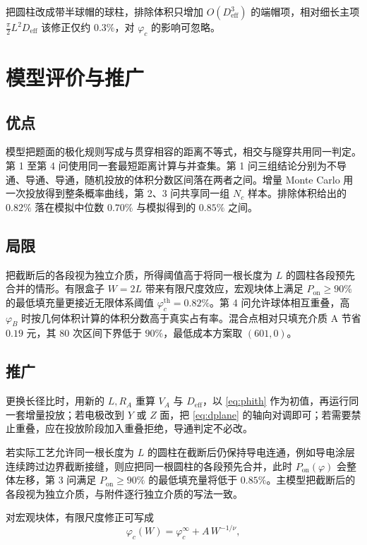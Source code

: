 \documentclass[UTF8,a4paper,zihao=-4,fontset=none]{ctexart}
\begin{document}
把圆柱改成带半球帽的球柱，排除体积只增加 $O(D_{\mathrm{eff}}^3)$ 的端帽项，相对细长主项 $\frac{\pi}{2}L^2 D_{\mathrm{eff}}$ 该修正仅约 $0.3\%$，对 $\varphi_c$ 的影响可忽略。

\section{模型评价与推广}

\subsection{优点}

模型把题面的极化规则写成与贯穿相容的距离不等式，相交与隧穿共用同一判定。第 1 至第 4 问使用同一套最短距离计算与并查集。第 1 问三组结论分别为不导通、导通、导通，随机投放的体积分数区间落在两者之间。增量 Monte Carlo 用一次投放得到整条概率曲线，第 2、3 问共享同一组 $N_c$ 样本。排除体积给出的 $0.82\%$ 落在模拟中位数 $0.70\%$ 与模拟得到的 $0.85\%$ 之间。

\subsection{局限}

把截断后的各段视为独立介质，所得阈值高于将同一根长度为 $L$ 的圆柱各段预先合并的情形。有限盒子 $W=2L$ 带来有限尺度效应，宏观块体上满足 $P_{\mathrm{on}}\ge 90\%$ 的最低填充量更接近无限体系阈值 $\varphi_c^{\mathrm{th}}=0.82\%$。第 4 问允许球体相互重叠，高 $\varphi_B$ 时按几何体积计算的体积分数高于真实占有率。混合点相对只填充介质 A 节省 $0.19$ 元，其 $80$ 次区间下界低于 $90\%$，最低成本方案取 $(601,0)$。

\subsection{推广}

更换长径比时，用新的 $L,R_A$ 重算 $V_A$ 与 $D_{\mathrm{eff}}$，以 \eqref{eq:phith} 作为初值，再运行同一套增量投放；若电极改到 $Y$ 或 $Z$ 面，把 \eqref{eq:dplane} 的轴向对调即可；若需要禁止重叠，应在投放阶段加入重叠拒绝，导通判定不必改。

若实际工艺允许同一根长度为 $L$ 的圆柱在截断后仍保持导电连通，例如导电涂层连续跨过边界截断接缝，则应把同一根圆柱的各段预先合并，此时 $P_{\mathrm{on}}(\varphi)$ 会整体左移，第 3 问满足 $P_{\mathrm{on}}\ge 90\%$ 的最低填充量将低于 $0.85\%$。主模型把截断后的各段视为独立介质，与附件逐行独立介质的写法一致。

对宏观块体，有限尺度修正可写成
\[
\varphi_c(W)=\varphi_c^{\infty}+A\,W^{-1/\nu},
\]
\end{document}
